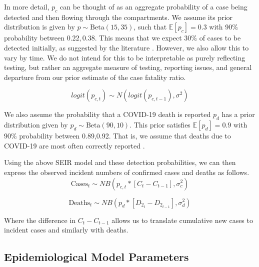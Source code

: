 \documentclass{umassthesis}          %
\newcommand{\Beta}{\text{Beta}}
\newcommand{\E}{\mathbb{E}}
\begin{document}
In more detail, $p_c$ can be thought of as an aggregate probability of a case being detected and then flowing through the compartments. We assume its prior distribution is given by  $p \sim \Beta(15, 35)$, such that  $\E[p_c] = 0.3$  with 90\% probability between $0.22,0.38$. This means that we expect 30\% of cases to be detected initially, as suggested by the literature \cite{midas}. However, we also allow this to vary by time. We do not intend for this to be interpretable as purely reflecting testing, but rather an aggregate measure of testing, reporting issues, and general departure from our prior estimate of the case fatality ratio.

\begin{equation}
logit(p_{c,t}) \sim N(logit(p_{c,t-1}), \sigma^2)
\end{equation}

We also assume the probability that a COVID-19 death is reported $p_d$ has a prior distribution given by  $p_d \sim \Beta(90, 10)$. This prior satisfies $\E[p_d] = 0.9$ with 90\% probability between 0.89,0.92. That is, we assume that deaths due to COVID-19 are most often correctly reported \cite{weinberger2020estimation}. 

 


Using the above SEIR model and these detection probabilities, we can then express the observed incident numbers of confirmed cases and deaths as follows.
\begin{equation}
\text{Cases}_{t} \sim NB(p_{c,t}*[C_{t} - C_{t-1}],\sigma_{c}^2)
\end{equation}

\begin{equation}
\text{Deaths}_{t} \sim NB(p_d*[D_{2_{t}} - D_{2_{t-1}}], \sigma_d^2)
\end{equation}

Where the difference in $C_{t}-C_{t-1}$ allows us to translate cumulative new cases to incident cases and similarly with deaths. 
%

\subsection{Epidemiological Model Parameters}
\end{document}
